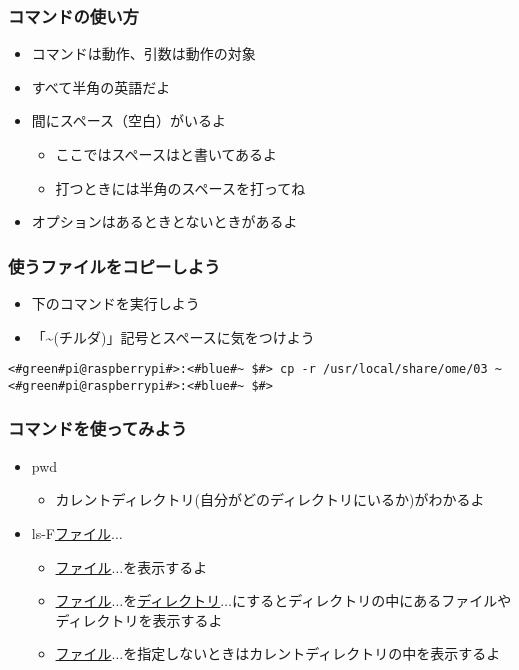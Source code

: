 \begin{frame}
    \frametitle{コマンドの使い方}
    \begin{figure}[h]
        \centering
        
    \end{figure}
    \begin{itemize}
        \item コマンドは動作、引数は動作の対象
        \item すべて半角の英語だよ
        \item 間にスペース（空白）がいるよ
            \begin{itemize}
                \item ここではスペースは\textvisiblespace と書いてあるよ
                \item 打つときには半角のスペースを打ってね
            \end{itemize}
        \item オプションはあるときとないときがあるよ
    \end{itemize}
\end{frame}

\begin{frame}[fragile]
    \frametitle{使うファイルをコピーしよう}
    \begin{itemize}
        \item 下のコマンドを実行しよう
        \item 「\textasciitilde(チルダ)」記号とスペースに気をつけよう
    \end{itemize}
    \begin{lstlisting}[title=使うファイルのコピー,label=workfilecopy]
<#green#pi@raspberrypi#>:<#blue#~ $#> cp -r /usr/local/share/ome/03 ~
<#green#pi@raspberrypi#>:<#blue#~ $#>
    \end{lstlisting}
\end{frame}

\begin{frame}
    \frametitle{コマンドを使ってみよう}
    \begin{itemize}
        \item pwd
        \begin{itemize}
            \item カレントディレクトリ(自分がどのディレクトリにいるか)がわかるよ
        \end{itemize}
        \item ls\textvisiblespace -F\textvisiblespace\underline{ファイル}$\ldots$
        \begin{itemize}
            \item \underline{ファイル}$\ldots$を表示するよ
            \item \underline{ファイル}$\ldots$を\underline{ディレクトリ}$\ldots$にするとディレクトリの中にあるファイルやディレクトリを表示するよ
            \item \underline{ファイル}$\ldots$を指定しないときはカレントディレクトリの中を表示するよ
        \end{itemize}
    \end{itemize}
\end{frame}

